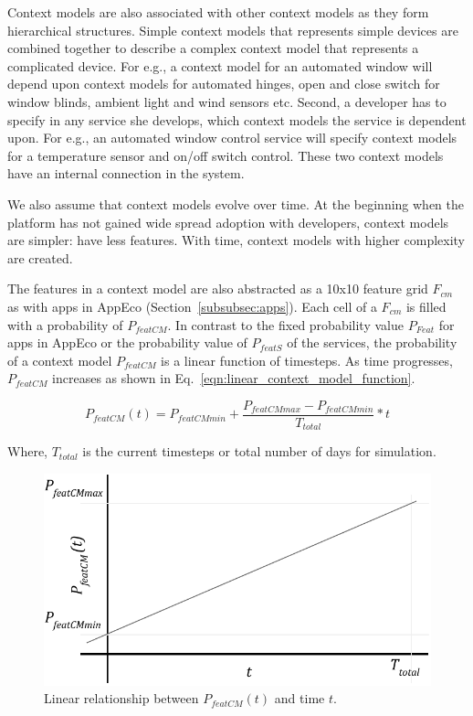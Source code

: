 Context models are also associated with other context models as they form hierarchical structures. Simple context models that represents simple devices are combined together to describe a complex context model that represents a complicated device. For e.g., a context model for an automated window will depend upon context models for automated hinges, open and close switch for window blinds, ambient light and wind sensors etc. Second, a developer has to specify in any service she develops, which context models the service is dependent upon. For e.g., an automated window control service will specify context models for a temperature sensor and on/off switch control. These two context models have an internal connection in the system.

We also assume that context models evolve over time. At the beginning when the platform has not gained wide spread adoption with developers, context models are simpler: have less features. With time, context models with higher complexity are created.

The features in a context model are also abstracted as a 10x10 feature grid $F_{cm}$ as with apps in AppEco (Section~\ref{subsubsec:apps}). Each cell of a $F_{cm}$ is filled with a probability of $P_{featCM}$. In contrast to the fixed probability value $P_{Feat}$ for apps in AppEco or the probability value of $P_{featS}$ of the services, the probability of a context model $P_{featCM}$ is a linear function of timesteps. As time progresses, $P_{featCM}$ increases as shown in Eq.~\ref{eqn:linear_context_model_function}.

\begin{equation}\label{eqn:linear_context_model_function}
P_{featCM}(t) = P_{featCMmin} + \frac{P_{featCMmax} - P_{featCMmin}}{T_{total}} * t
\end{equation}

Where, $T_{total}$ is the current timesteps or total number of days for simulation.

\begin{figure}[!htb]
  \centering
  \includegraphics[width=12cm]{figures/probability-of-feature-vs-time.pdf}
  \caption{Linear relationship between $P_{featCM}(t)$ and time $t$.}
  \label{fig:probability-of-feature-vs-time}
\end{figure}

